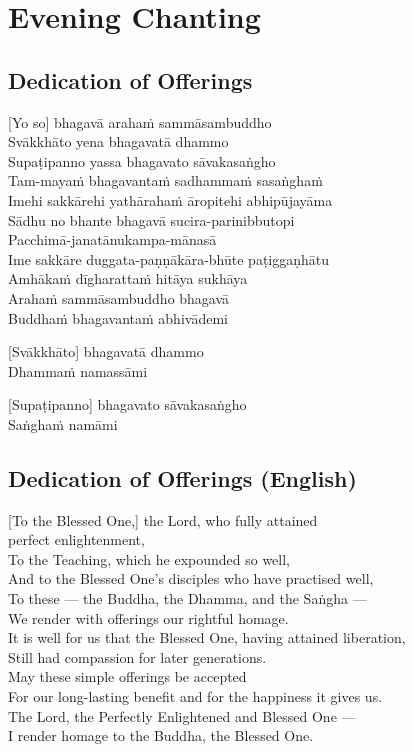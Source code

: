 \chapter{Evening Chanting}

\section*{Dedication of Offerings}


[Yo so] bhagavā arahaṁ sammāsambuddho\\
Svākkhāto yena bhagavatā dhammo\\
Supaṭipanno yassa bhagavato sāvakasaṅgho\\
Tam-mayaṁ bhagavantaṁ sadhammaṁ sasaṅghaṁ\\
Imehi sakkārehi yathārahaṁ āropitehi abhipūjayāma\\
Sādhu no bhante bhagavā sucira-parinibbutopi\\
Pacchimā-janatānukampa-mānasā\\
Ime sakkāre duggata-paṇṇākāra-bhūte paṭiggaṇhātu\\
Amhākaṁ dīgharattaṁ hitāya sukhāya\\
Arahaṁ sammāsambuddho bhagavā\\
Buddhaṁ bhagavantaṁ abhivādemi

[Svākkhāto] bhagavatā dhammo\\
Dhammaṁ namassāmi

[Supaṭipanno] bhagavato sāvakasaṅgho\\
Saṅghaṁ namāmi

\section*{Dedication of Offerings (English)}

[To the Blessed One,] the Lord, who fully attained\\
\vin perfect enlightenment,\\
To the Teaching, which he expounded so well,\\
And to the Blessed One's disciples who have practised well,\\
To these --- the Buddha, the Dhamma, and the Saṅgha ---\\
We render with offerings our rightful homage.\\
It is well for us that the Blessed One, having attained liberation,\\
Still had compassion for later generations.\\
May these simple offerings be accepted\\
For our long-lasting benefit and for the happiness it gives us.\\
The Lord, the Perfectly Enlightened and Blessed One ---\\
I render homage to the Buddha, the Blessed One.

